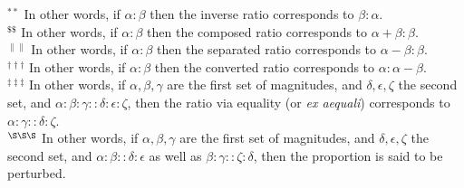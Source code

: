 {$^{\ast\ast}$ In other words, if  $\alpha:\beta$ then the inverse ratio
corresponds to $\beta:\alpha$.\\[0.5ex]
$^{\$\$}$ In other words, if
 $\alpha:\beta$ then the composed ratio
 corresponds to  $\alpha+\beta:\beta$.\\[0.5ex]
 $^{\|\|}$ In other words, if
 $\alpha:\beta$ then the separated ratio
 corresponds to  $\alpha-\beta:\beta$.\\[0.5ex]
 $^{\dag\dag\dag}$ In other words, if
 $\alpha:\beta$ then the converted ratio
 corresponds to  $\alpha:\alpha-\beta$.\\[0.5ex]
 $^{\ddag\ddag\ddag}$ In other words, if $\alpha, \beta, \gamma$ are the first set of
 magnitudes, and $\delta, \epsilon, \zeta$ the second set, and $\alpha:
 \beta:\gamma::\delta:\epsilon:\zeta$,  then
 the ratio via equality (or {\em ex aequali}) corresponds to
 $\alpha:\gamma::\delta:\zeta$.\\[0.5ex]
 $^{\S\S\S}$ In other words, if $\alpha, \beta, \gamma$ are the first set of
 magnitudes, and $\delta, \epsilon, \zeta$ the second set, and $\alpha:\beta::\delta:\epsilon$ as well as $\beta:\gamma::\zeta:\delta$, then
 the proportion is said to be perturbed.}

